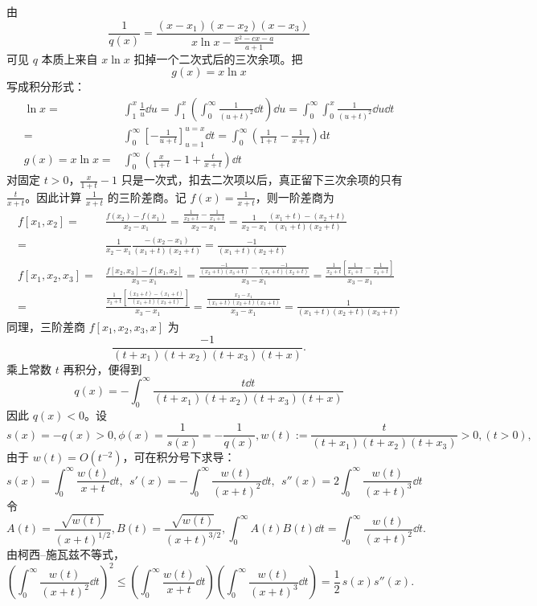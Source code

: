 \begin{solution}
由
\[
\frac{1}{q(x)}=\frac{(x-x_1)(x-x_2)(x-x_3)}{x\ln x-\frac{x^2-cx-a}{a+1}}
\]
可见 $q$ 本质上来自 $x\ln x$ 扣掉一个二次式后的三次余项。把
\[
g(x)=x\ln x
\]
写成积分形式：
\begin{align*}
\ln x=&\int_1^x\frac1u\dd u=\int_1^x\left(\int_0^{\infty}\frac{1}{(u+t)^2}\dd t\right)\dd u=\int_0^{\infty}\int_0^x \frac{1}{(u+t)^2}\dd u\dd t\\
=& \int_0^\infty\left[ -\frac{1}{u+t} \right]_{u=1}^{u=x} \dd t= \int_0^\infty \left( \frac{1}{1+t} - \frac{1}{x+t} \right) \mathrm{d}t\\
g(x)=x\ln x=&\int_0^\infty\left(\frac{x}{1+t}-1+\frac{t}{x+t}\right)\dd t
\end{align*}
对固定 $t>0$，$\frac{x}{1+t}-1$ 只是一次式，扣去二次项以后，真正留下三次余项的只有 $\frac{t}{x+t}$。因此计算 $\frac{1}{x+t}$ 的三阶差商。记 $f(x)=\frac{1}{x+t}$，则一阶差商为
\begin{align*}
f[x_1, x_2] =& \frac{f(x_2) - f(x_1)}{x_2 - x_1}=\frac{\frac{1}{x_2+t} - \frac{1}{x_1+t}}{x_2-x_1}=\frac1{x_2-x_1}\frac{(x_1+t) - (x_2+t)}{(x_1+t)(x_2+t)}\\
=&\frac1{x_2-x_1}\frac{-(x_2 - x_1)}{(x_1+t)(x_2+t)}=\frac{-1}{(x_1+t)(x_2+t)}\\
f[x_1, x_2, x_3] =& \frac{f[x_2, x_3] - f[x_1, x_2]}{x_3 - x_1}=\frac{ \frac{-1}{(x_2+t)(x_3+t)} - \frac{-1}{(x_1+t)(x_2+t)}}{x_3 - x_1}=\frac{\frac{1}{x_2+t} \left[ \frac{1}{x_1+t} - \frac{1}{x_3+t} \right]}{x_3-x_1}\\
=&\frac{\frac{1}{x_2+t} \left[ \frac{(x_3+t) - (x_1+t)}{(x_1+t)(x_3+t)} \right]}{x_3-x_1}=\frac{\frac{x_3 - x_1}{(x_1+t)(x_2+t)(x_3+t)}}{x_3-x_1}=\frac{1}{(x_1+t)(x_2+t)(x_3+t)}
\end{align*}
同理，三阶差商 $f[x_1, x_2, x_3, x]$ 为
\[
\frac{-1}{(t+x_1)(t+x_2)(t+x_3)(t+x)}.
\]
乘上常数 $t$ 再积分，便得到
\[q(x)= -\int_{0}^{\infty}\frac{t\dd t}{(t+x_1)(t+x_2)(t+x_3)(t+x)}\]
因此 $q(x)<0$。设
\[
s(x)=-q(x)>0,\phi(x)=\frac{1}{s(x)}=-\frac{1}{q(x)},w(t):=\frac{t}{(t+x_1)(t+x_2)(t+x_3)}>0, (t>0),
\]
由于 $w(t)=O(t^{-2})$，可在积分号下求导：
\[s(x)=\int_0^\infty \frac{w(t)}{x+t}\dd t,~~s'(x)=-\int_0^\infty \frac{w(t)}{(x+t)^2}\dd t,~~s''(x)=2\int_0^\infty \frac{w(t)}{(x+t)^3}\dd t\]
令
\[A(t)=\frac{\sqrt{w(t)}}{(x+t)^{1/2}},B(t)=\frac{\sqrt{w(t)}}{(x+t)^{3/2}},\int_0^\infty A(t)B(t)\dd t=\int_0^\infty\frac{w(t)}{(x+t)^2}\dd t.\]
由柯西--施瓦兹不等式，
\[
\left(\int_0^\infty\frac{w(t)}{(x+t)^2}\dd t\right)^2
\leqslant
\left(\int_0^\infty\frac{w(t)}{x+t}\dd t\right)
\left(\int_0^\infty\frac{w(t)}{(x+t)^3}\dd t\right)
=\frac12\,s(x)s''(x).
\]
\end{solution}
